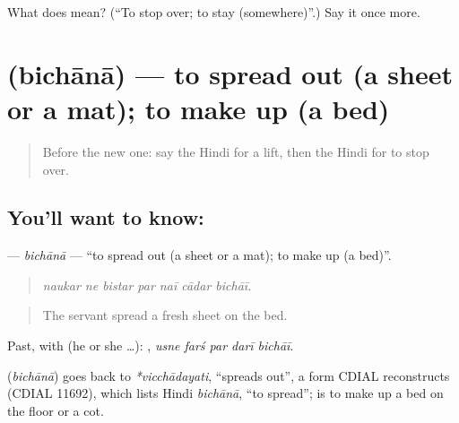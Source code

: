 \begin{tcolorbox}[breakable,colback=teal!4,colframe=teal!35!black,title={Before you move on}]
What does  mean? (\textquotedblleft{}To stop over; to stay (somewhere)\textquotedblright{}.) Say it once more.
\end{tcolorbox}
\section[\texorpdfstring{\hi{बिछाना} (bichānā)}{बिछाना (bichānā)}]{ (bichānā) — to spread out (a sheet or a mat); to make up (a bed)}

\label{lesson:HI-C413-bichana}



\begin{quote}
Before the new one: say the Hindi for a lift, then the Hindi for to stop over.
\end{quote}

\subsection*{You'll want to know: }
\textbf{} — \emph{bichānā} — \textquotedblleft{}to spread out (a sheet or a mat); to make up (a bed)\textquotedblright{}.

\begin{quote}
      
\end{quote}

\begin{quote}
\emph{naukar ne bistar par naī cādar bichāī.}
\end{quote}

\begin{quote}
The servant spread a fresh sheet on the bed.
\end{quote}

Past, with  (he or she …):     , \emph{usne farś par darī bichāī}.

\begin{cousinweb}
\textbf{} (\emph{bichānā}) goes back to \emph{*vicchādayati}, \textquotedblleft{}spreads out\textquotedblright{}, a form CDIAL reconstructs (CDIAL 11692), which lists Hindi \emph{bichānā}, \textquotedblleft{}to spread\textquotedblright{};   is to make up a bed on the floor or a cot.
\end{cousinweb}

